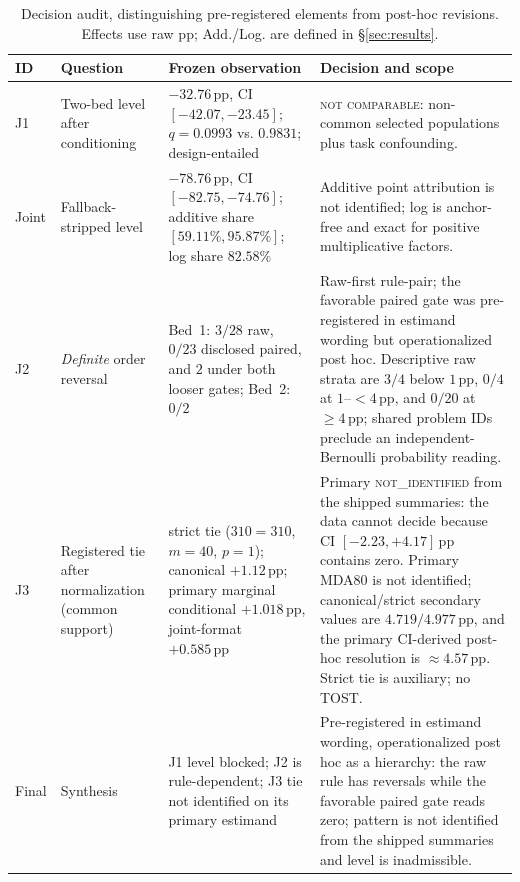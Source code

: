 \documentclass{article}
\newcommand{\pp}{\,\mathrm{pp}}
\newcommand{\blocked}{\textsc{not comparable}}
\begin{document}
\begin{table}[!h]
\centering\footnotesize
\setlength{\tabcolsep}{3pt}
\begin{tabular}{@{}>{\raggedright\arraybackslash}p{0.8cm}
                    >{\raggedright\arraybackslash}p{2.9cm}
                    >{\raggedright\arraybackslash}p{4.60cm}
                    >{\raggedright\arraybackslash}p{5.05cm}@{}}
\toprule
ID & Question & Frozen observation & Decision and scope \\
\midrule
J1 & Two-bed level after conditioning &
$-32.76\pp$, CI $[-42.07,-23.45]$; $q=0.0993$ vs. $0.9831$; design-entailed &
\blocked: non-common selected populations plus task confounding. \\
Joint & Fallback-stripped level &
$-78.76\pp$, CI $[-82.75,-74.76]$; additive share $[59.11\%,95.87\%]$; log share $82.58\%$ &
Additive point attribution is not identified; log is anchor-free and exact for positive multiplicative factors. \\
J2 & \emph{Definite} order reversal &
Bed~1: $3/28$ raw, $0/23$ disclosed paired, and $2$ under both looser gates; Bed~2: $0/2$ &
Raw-first rule-pair; the favorable paired gate was pre-registered in estimand
wording but operationalized post hoc.  Descriptive raw strata are $3/4$ below
$1\pp$, $0/4$ at $1$--$<4\pp$, and $0/20$ at $\geq4\pp$; shared problem IDs
preclude an independent-Bernoulli probability reading. \\
J3 & Registered tie after normalization (common support) &
strict tie ($310=310$, $m{=}40$, $p{=}1$); canonical $+1.12\pp$; primary marginal conditional $+1.018\pp$, joint-format $+0.585\pp$ &
Primary \textsc{not\_identified} from the shipped summaries: the data cannot
decide because CI $[-2.23,+4.17]\pp$ contains zero.  Primary MDA80 is not
identified; canonical/strict secondary values are $4.719/4.977\pp$, and the
primary CI-derived post-hoc resolution is $\approx4.57\pp$.  Strict tie is
auxiliary; no TOST. \\
Final & Synthesis &
J1 level blocked; J2 is rule-dependent; J3 tie not identified on its primary estimand &
Pre-registered in estimand wording, operationalized post hoc as a hierarchy:
the raw rule has reversals while the favorable paired gate reads zero; pattern
is not identified from the shipped summaries and level is inadmissible. \\
\bottomrule
\end{tabular}
\caption{Decision audit, distinguishing pre-registered elements from post-hoc
revisions. Effects use raw pp; Add./Log. are defined in \S\ref{sec:results}.}
\label{tab:judgments}
\end{table}
\end{document}
